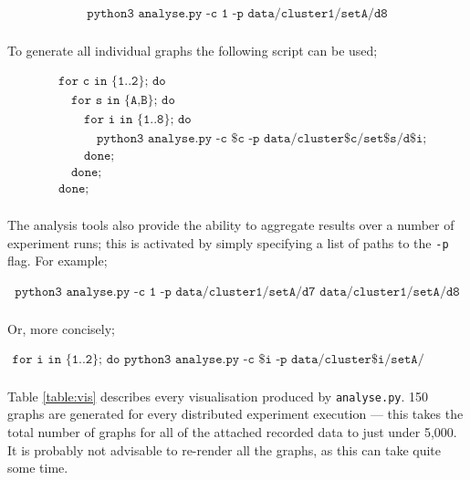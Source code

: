 \documentclass[a4paper,10pt]{article}
\begin{document}
\vspace{-4mm}
\begin{align*}
    \texttt{python3 analyse.py -c 1 -p data/cluster1/setA/d8}
\end{align*}

\paragraph{} To generate all individual graphs the following script can be used;

\vspace{-4mm}
\begin{align*}
    & \texttt{for c in \{1..2\}; do} \\
    & \quad \texttt{for s in \{A,B\}; do} \\
    & \quad \quad \texttt{for i in \{1..8\}; do}\\
    & \quad \quad \quad \texttt{python3 analyse.py -c \$c -p data/cluster\$c/set\$s/d\$i;} \\
    & \quad \quad \texttt{done;} \\
    & \quad \texttt{done;} \\
    & \texttt{done;}
\end{align*}

\paragraph{} The analysis tools also provide the ability to aggregate results over a number of experiment runs; this is activated by simply specifying a list of paths to the \texttt{-p} flag. For example;

\vspace{-4mm}
\begin{align*}
    \texttt{python3 analyse.py -c 1 -p data/cluster1/setA/d7 data/cluster1/setA/d8}
\end{align*}

\paragraph{} Or, more concisely;

\vspace{-4mm}
\begin{align*}
    \texttt{for i in \{1..2\}; do python3 analyse.py -c \$i -p data/cluster\$i/setA/d\{1..8\}; done}
\end{align*}

\paragraph{} Table \ref{table:vis} describes every visualisation produced by \texttt{analyse.py}. 150 graphs are generated for every distributed experiment execution --- this takes the total number of graphs for all of the attached recorded data to just under 5,000. It is probably not advisable to re-render all the graphs, as this can take quite some time.  
\end{document}
